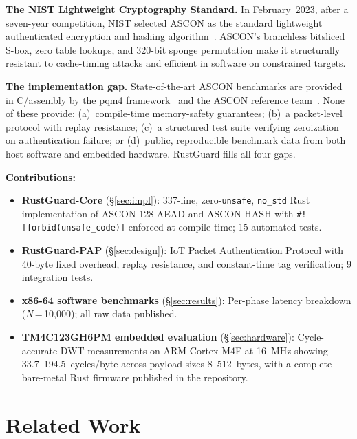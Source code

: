 \documentclass[anonymous]{ndss}
\newcommand{\code}[1]{\mbox{\texttt{#1}}}
\newcommand{\nstd}{\texttt{no\_std}}
\newcommand{\forbid}{\code{\#![forbid(unsafe\_code)]}}
\begin{document}
\textbf{The NIST Lightweight Cryptography Standard.}
In February~2023, after a seven-year competition, NIST selected ASCON as the
standard lightweight authenticated encryption and hashing algorithm~\cite{b5}.
ASCON's branchless bitsliced S-box, zero table lookups, and 320-bit sponge
permutation make it structurally resistant to cache-timing attacks and efficient
in software on constrained targets.

\textbf{The implementation gap.}
State-of-the-art ASCON benchmarks are provided in C/assembly by the pqm4
framework~\cite{b10} and the ASCON reference team~\cite{b12}. None of these
provide: (a)~compile-time memory-safety guarantees; (b)~a packet-level protocol
with replay resistance; (c)~a structured test suite verifying zeroization on
authentication failure; or (d)~public, reproducible benchmark data from both
host software and embedded hardware. RustGuard fills all four gaps.

\textbf{Contributions:}
\begin{itemize}
\item \textbf{RustGuard-Core} (\S\ref{sec:impl}): 337-line, zero-\texttt{unsafe},
      \nstd{} Rust implementation of ASCON-128 AEAD and ASCON-HASH with
      \forbid{} enforced at compile time; 15 automated tests.

\item \textbf{RustGuard-PAP} (\S\ref{sec:design}): IoT Packet Authentication
      Protocol with 40-byte fixed overhead, replay resistance, and constant-time
      tag verification; 9 integration tests.

\item \textbf{x86-64 software benchmarks} (\S\ref{sec:results}): Per-phase
      latency breakdown ($N$\,=\,10{,}000); all raw data published.

\item \textbf{TM4C123GH6PM embedded evaluation} (\S\ref{sec:hardware}):
      Cycle-accurate DWT measurements on ARM Cortex-M4F at 16~MHz showing
      33.7--194.5~cycles/byte across payload sizes 8--512~bytes, with a
      complete bare-metal Rust firmware published in the repository.
\end{itemize}

\section{Related Work}
\label{sec:related}
\end{document}
